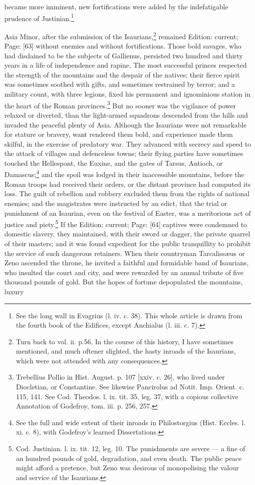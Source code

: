 became more imminent, new fortifications were added by the indefatigable prudence of Justinian.\footnote{See the long wall in Evagrius (l. iv. c. 38). This whole article is drawn from the fourth book of the Edifices, except Anchialus (l. iii. c. 7).}

Asia Minor, after the submission of the Isaurians,\footnote{Turn back to vol. ii. p.56. In the course of this history, I have sometimes mentioned, and much oftener slighted, the hasty inroads of the Isaurians, which were not attended with any consequences.} remained Edition: current; Page: [63] without enemies and without fortifications. Those bold savages, who had disdained to be the subjects of Gallienus, persisted two hundred and thirty years in a life of independence and rapine. The most successful princes respected the strength of the mountains and the despair of the natives; their fierce spirit was sometimes soothed with gifts, and sometimes restrained by terror; and a military count, with three legions, fixed his permanent and ignominious station in the heart of the Roman provinces.\footnote{Trebellius Pollio in Hist. August. p. 107 [xxiv. c. 26], who lived under Diocletian, or Constantine. See likewise Pancirolus ad Notit. Imp. Orient. c. 115, 141. See Cod. Theodos. l. ix. tit. 35, leg. 37, with a copious collective Annotation of Godefroy, tom. iii. p. 256, 257.} But no sooner was the vigilance of power relaxed or diverted, than the light-armed squadrons descended from the hills and invaded the peaceful plenty of Asia. Although the Isaurians were not remarkable for stature or bravery, want rendered them bold, and experience made them skilful, in the exercise of predatory war. They advanced with secrecy and speed to the attack of villages and defenceless towns; their flying parties have sometimes touched the Hellespont, the Euxine, and the gates of Tarsus, Antioch, or Damascus;\footnote{See the full and wide extent of their inroads in Philostorgius (Hist. Eccles. l. xi. c. 8), with Godefroy\texthebrew{}’s learned Dissertations.} and the spoil was lodged in their inaccessible mountains, before the Roman troops had received their orders, or the distant province had computed its loss. The guilt of rebellion and robbery excluded them from the rights of national enemies; and the magistrates were instructed by an edict, that the trial or punishment of an Isaurian, even on the festival of Easter, was a meritorious act of justice and piety.\footnote{Cod. Justinian. l. ix. tit. 12, leg. 10. The punishments are severe \texthebrew{—} a fine of an hundred pounds of gold, degradation, and even death. The public peace might afford a pretence, but Zeno was desirous of monopolising the valour and service of the Isaurians.} If the Edition: current; Page: [64] captives were condemned to domestic slavery, they maintained, with their sword or dagger, the private quarrel of their masters; and it was found expedient for the public tranquillity to prohibit the service of such dangerous retainers. When their countryman Tarcalissæus or Zeno ascended the throne, he invited a faithful and formidable band of Isaurians, who insulted the court and city, and were rewarded by an annual tribute of five thousand pounds of gold. But the hopes of fortune depopulated the mountains, luxury 